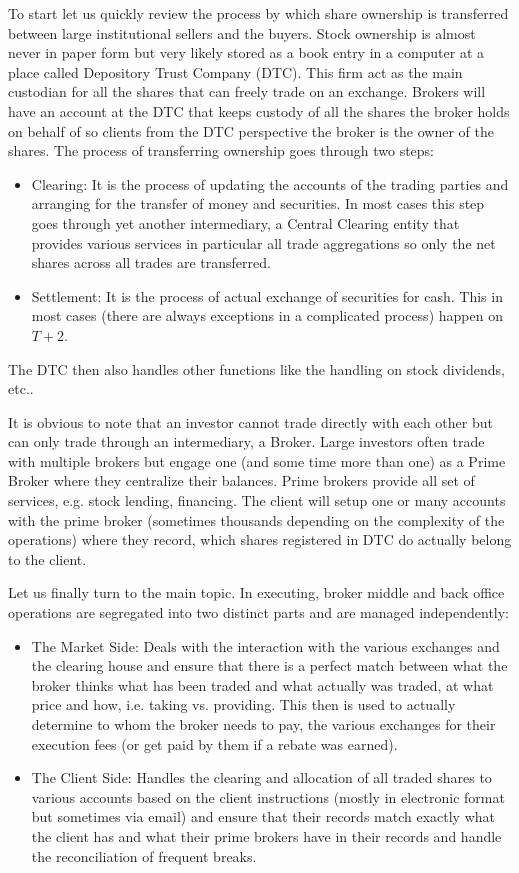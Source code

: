 To start let us quickly review the process by which share ownership is transferred between large institutional sellers and the buyers. Stock ownership is almost never in paper form but very likely stored as a book entry in a computer at a place called Depository Trust Company (DTC). This firm act as the main custodian for all the shares that can freely trade on an exchange. Brokers will have an account at the DTC that keeps custody of all the shares the broker holds on behalf of so clients from the DTC perspective the broker is the owner of the shares. The process of transferring ownership goes through two steps:
        \begin{itemize}
        \item Clearing: It is the process of updating the accounts of the trading parties and arranging for the transfer of money and securities. In most cases this step goes through yet another intermediary, a Central Clearing entity that provides various services in particular all trade aggregations so only the net shares across all trades are  transferred.
        \item Settlement: It is the process of actual exchange of securities for cash. This in most cases (there are always exceptions in a complicated process) happen on $T+2$.
        \end{itemize}
The DTC then also handles other functions like the handling on stock dividends, etc..


It is obvious to note that an investor cannot trade directly with each other but can only trade through an intermediary, a Broker. Large investors often trade with multiple brokers but engage one (and some time more than one) as a Prime Broker where they centralize their balances. Prime brokers provide all set of services, e.g. stock lending, financing. The client will setup one or many accounts with the prime broker (sometimes thousands depending on the complexity of the operations) where they record, which shares registered in DTC do actually belong to the client.


Let us finally turn to the main topic. In executing, broker middle and back office operations are segregated into two distinct parts and are managed independently: 
        \begin{itemize}
        \item The Market Side: Deals with the interaction with the various exchanges  and the clearing house and ensure that there is a perfect match between what the broker thinks what has been traded and what actually was traded, at what price and how, i.e. taking vs. providing. This then is used to actually determine to whom the broker needs to pay, the various exchanges for their execution fees (or get paid by them if a rebate was earned).
        \item The Client Side: Handles the clearing and allocation of all traded shares to various accounts based on the client instructions (mostly in electronic format but sometimes via email) and ensure that their records match exactly what the client has and what their prime brokers have in their records and handle the reconciliation of frequent breaks.
        \end{itemize}


